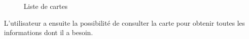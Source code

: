 \documentclass[a4paper,oneside,10pt]{extarticle}
\begin{document}
\begin{figure}[H]
\begin{minipage}[c]{.46\linewidth}
        \caption{Liste de cartes}
    \end{minipage}
\end{figure}

L'utilisateur a ensuite la possibilité de consulter la carte pour obtenir toutes les informations dont il a besoin.

\newpage

\end{document}

